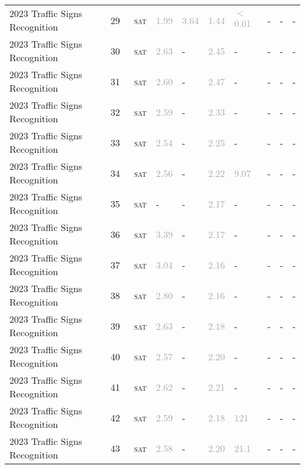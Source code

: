 \begin{center}
{\begin{longtable}{@{}llllllllll@{}}
2023 Traffic Signs Recognition & 29 & ~\textsc{sat} & \textcolor{darkgray}{1.99} & \textcolor{darkgray}{3.64} & \textcolor{darkgray}{1.44} & \textcolor{darkgray}{$<$0.01} & - & - & - \\
2023 Traffic Signs Recognition & 30 & ~\textsc{sat} & \textcolor{darkgray}{2.63} & - & \textcolor{darkgray}{2.45} & - & - & - & - \\
2023 Traffic Signs Recognition & 31 & ~\textsc{sat} & \textcolor{darkgray}{2.60} & - & \textcolor{darkgray}{2.47} & - & - & - & - \\
2023 Traffic Signs Recognition & 32 & ~\textsc{sat} & \textcolor{darkgray}{2.59} & - & \textcolor{darkgray}{2.33} & - & - & - & - \\
2023 Traffic Signs Recognition & 33 & ~\textsc{sat} & \textcolor{darkgray}{2.54} & - & \textcolor{darkgray}{2.25} & - & - & - & - \\
2023 Traffic Signs Recognition & 34 & ~\textsc{sat} & \textcolor{darkgray}{2.56} & - & \textcolor{darkgray}{2.22} & \textcolor{darkgray}{9.07} & - & - & - \\
2023 Traffic Signs Recognition & 35 & ~\textsc{sat} & - & - & \textcolor{darkgray}{2.17} & - & - & - & - \\
2023 Traffic Signs Recognition & 36 & ~\textsc{sat} & \textcolor{darkgray}{3.39} & - & \textcolor{darkgray}{2.17} & - & - & - & - \\
2023 Traffic Signs Recognition & 37 & ~\textsc{sat} & \textcolor{darkgray}{3.04} & - & \textcolor{darkgray}{2.16} & - & - & - & - \\
2023 Traffic Signs Recognition & 38 & ~\textsc{sat} & \textcolor{darkgray}{2.80} & - & \textcolor{darkgray}{2.16} & - & - & - & - \\
2023 Traffic Signs Recognition & 39 & ~\textsc{sat} & \textcolor{darkgray}{2.63} & - & \textcolor{darkgray}{2.18} & - & - & - & - \\
2023 Traffic Signs Recognition & 40 & ~\textsc{sat} & \textcolor{darkgray}{2.57} & - & \textcolor{darkgray}{2.20} & - & - & - & - \\
2023 Traffic Signs Recognition & 41 & ~\textsc{sat} & \textcolor{darkgray}{2.62} & - & \textcolor{darkgray}{2.21} & - & - & - & - \\
2023 Traffic Signs Recognition & 42 & ~\textsc{sat} & \textcolor{darkgray}{2.59} & - & \textcolor{darkgray}{2.18} & \textcolor{darkgray}{121} & - & - & - \\
2023 Traffic Signs Recognition & 43 & ~\textsc{sat} & \textcolor{darkgray}{2.58} & - & \textcolor{darkgray}{2.20} & \textcolor{darkgray}{21.1} & - & - & - \\

\end{longtable}}
\end{center}
